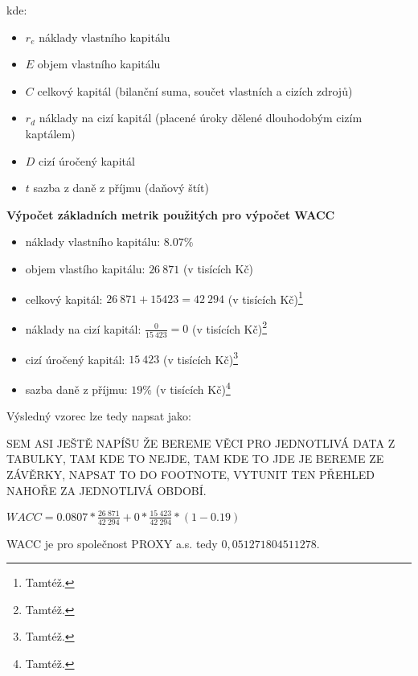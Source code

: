 kde:\\

\begin{itemize}
	\item $r_e$ náklady vlastního kapitálu
	\item $E$ objem vlastního kapitálu
	\item $C$ celkový kapitál (bilanční suma, součet vlastních a cizích zdrojů)
	\item $r_d$ náklady na cizí kapitál (placené úroky dělené dlouhodobým cizím kaptálem)
	\item $D$ cizí úročený kapitál
	\item $t$ sazba z daně z příjmu (daňový štít)
\end{itemize}

\noindent\textbf{Výpočet základních metrik použitých pro výpočet WACC}

\begin{itemize}
	\item náklady vlastního kapitálu: $8.07\%$%
	\item objem vlastího kapitálu: $26\ 871$ (v tisících Kč)
	\item celkový kapitál: $26\ 871 + 15 423 = 42\ 294$ (v tisících Kč)\footnote{Tamtéž.}
	\item náklady na cizí kapitál: $\frac{0}{15\ 423} = 0$ (v tisících Kč)\footnote{Tamtéž.}
	\item cizí úročený kapitál: $15\ 423$ (v tisících Kč)\footnote{Tamtéž.}
	\item sazba daně z příjmu: $19\%$ (v tisících Kč)\footnote{Tamtéž.}
\end{itemize}

Výsledný vzorec lze tedy napsat jako:

SEM ASI JEŠTĚ NAPÍŠU ŽE BEREME VĚCI PRO JEDNOTLIVÁ DATA Z TABULKY, TAM KDE TO NEJDE, TAM KDE TO JDE JE BEREME ZE ZÁVĚRKY, NAPSAT TO DO FOOTNOTE, VYTUNIT TEN PŘEHLED NAHOŘE ZA JEDNOTLIVÁ OBDOBÍ.

\begin{center}
$WACC = 0.0807 * \frac{26\ 871}{42\ 294} + 0 * \frac{15\ 423}{42\ 294} * (1 - 0.19)$	
\end{center}

WACC je pro společnost PROXY a.s. tedy $0,051271804511278$.


